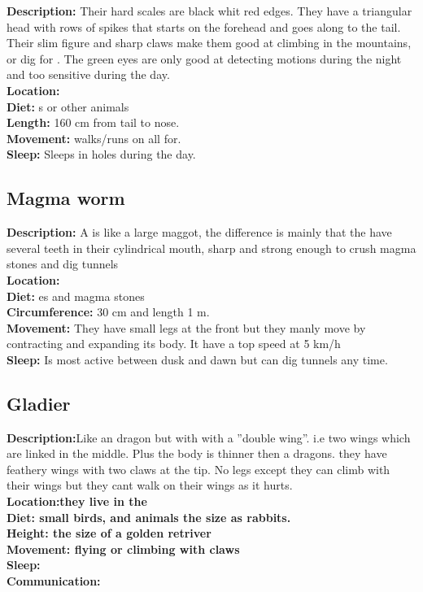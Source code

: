 \documentclass{article}
\begin{document}
\textbf{Description: } Their hard scales are black whit red edges. They have a triangular head with rows of spikes that starts on the forehead and  goes along to the tail. Their slim figure and sharp claws make them good at climbing in the mountains, or dig for . The  green eyes are only good at detecting motions during the night and too sensitive during the day.
\\\textbf{Location: }
\\\textbf{Diet: }s or other animals
\\\textbf{Length: } 160 cm from tail to nose.
\\\textbf{Movement: } walks/runs on all for.
\\\textbf{Sleep: } Sleeps in holes during the day.

\subsection{Magma worm}
\label{worms}

\textbf{Description: } A  is like a large maggot, the difference is mainly that the  have several teeth in their cylindrical mouth, sharp and strong enough to crush magma stones and dig tunnels 
\\\textbf{Location: }
\\\textbf{Diet: }es and magma stones
\\\textbf{Circumference: } 30 cm and length 1 m.
\\\textbf{Movement: } They have small legs at the front but they manly move by contracting and expanding its body. It have a top speed at 5 km/h
\\\textbf{Sleep: } Is most active between dusk and dawn but can dig tunnels any time.

\iffalse

\subsection{Gladier}

\textbf{Description:}Like an dragon but with with a ''double wing''. i.e two wings which are linked in the middle. Plus the body is thinner then a dragons. they have feathery wings with two claws at the tip. No legs except they can climb with their wings but they cant walk on their wings as it hurts.
\\\textbf{Location:they live in the  }
\\\textbf{Diet: small birds, and animals the size as rabbits.}
\\\textbf{Height: the size of a golden retriver  }
\\\textbf{Movement: flying or climbing with claws}
\\\textbf{Sleep: }
\\\textbf{Communication: }
\end{document}
